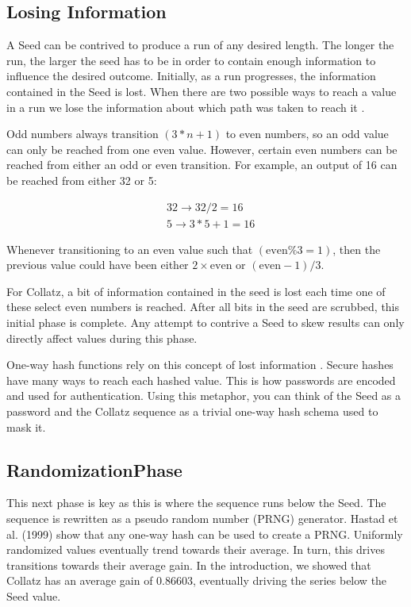 \documentclass[letterpaper]{article}
\begin{document}
\begin{multicols}{2}
\subsection{Losing Information}
A Seed can be contrived to produce a run of any desired length. The longer the run, the larger the seed has to be in order to contain enough information to influence the desired outcome. Initially, as a run progresses, the information contained in the Seed is lost. When there are two possible ways to reach a value in a run we lose the information about which path was taken to reach it \cite{2}.

Odd numbers always transition $(3*n + 1)$ to even numbers, so an odd value can only be reached from one even value. However, certain even numbers can be reached from either an odd or even transition. For example, an output of 16 can be reached from either 32 or 5:

\[
\begin{aligned}
    &32 \rightarrow 32 / 2 = 16 \\
    &5 \rightarrow 3*5 + 1 = 16
\end{aligned}
\]

Whenever transitioning to an even value such that $(\text{even} \% 3 = 1)$, then the previous value could have been either $2 \times \text{even}$ or $(\text{even} - 1) / 3$.

For Collatz, a bit of information contained in the seed is lost each time one of these select even numbers is reached. After all bits in the seed are scrubbed, this initial phase is complete. Any attempt to contrive a Seed to skew results can only directly affect values during this phase.

One-way hash functions rely on this concept of lost information \cite{3}. Secure hashes have many ways to reach each hashed value. This is how passwords are encoded and used for authentication. Using this metaphor, you can think of the Seed as a password and the Collatz sequence as a trivial one-way hash schema used to mask it.

\subsection{RandomizationPhase}

This next phase is key as this is where the sequence runs below the Seed. The sequence is rewritten as a pseudo random number (PRNG) generator. Hastad et al. (1999) \cite{4} show that any one-way hash can be used to create a PRNG. Uniformly randomized values eventually trend towards their average. In turn, this drives transitions towards their average gain. In the introduction, we showed that Collatz has an average gain of $0.86603$, eventually driving the series below the Seed value.


\end{multicols}
\end{document}
